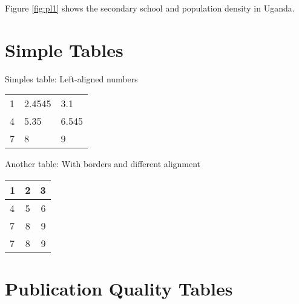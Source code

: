 \documentclass[a4paper]{article}
\begin{document}
Figure \ref{fig:pl1} shows the secondary school and population density in Uganda. 

\newpage %
\section{Simple Tables}

Simples table: Left-aligned numbers
\begin{center} %
\begin{tabular}{lll} %
1 & 2.4545 & 3.1\\
4 & 5.35 & 6.545\\
7&8&9\\
\end{tabular}
\end{center}

Another table: With borders and different alignment
\begin{center}%
\begin{tabular}{|l|c|r|} \hline
1 & 2 & 3\\ \hline
4 & 5 & 6\\
7 & 8 & 9 \\
7 & 8 & 9 \\ \hline
\end{tabular}
\end{center}

\newpage %
\section{Publication Quality Tables}
\end{document}
